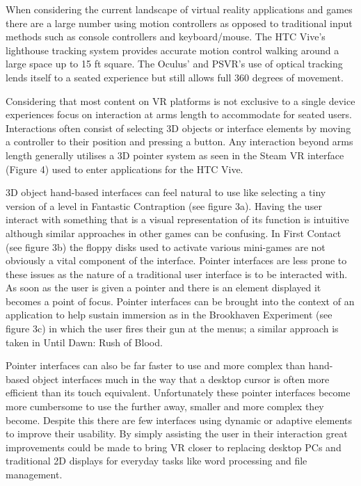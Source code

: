 \documentclass[12pt]{article}
\begin{document}
When considering the current landscape of virtual reality applications and games there are a large number using motion controllers as opposed to traditional input methods such as console controllers and keyboard/mouse. The HTC Vive's lighthouse tracking system provides accurate motion control walking around a large space up to 15 ft square. The Oculus' and PSVR's use of optical tracking lends itself to a seated experience but still allows full 360 degrees of movement. 

Considering that most content on VR platforms is not exclusive to a single device experiences focus on interaction at arms length to accommodate for seated users. Interactions often consist of selecting 3D objects or interface elements by moving a controller to their position and pressing a button. Any interaction beyond arms length generally utilises a 3D pointer system as seen in the Steam VR interface (Figure 4) used to enter applications for the HTC Vive.

3D object hand-based interfaces can feel natural to use like selecting a tiny version of a level in Fantastic Contraption (see figure 3a). Having the user interact with something that is a visual representation of its function is intuitive although similar approaches in other games can be confusing. In First Contact (see figure 3b) the floppy disks used to activate various mini-games are not obviously a vital component of the interface. Pointer interfaces are less prone to these issues as the nature of a traditional user interface is to be interacted with. As soon as the user is given a pointer and there is an element displayed it becomes a point of focus. Pointer interfaces can be brought into the context of an application to help sustain immersion as in the Brookhaven Experiment (see figure 3c) in which the user fires their gun at the menus; a similar approach is taken in Until Dawn: Rush of Blood. 

Pointer interfaces can also be far faster to use and more complex than hand-based object interfaces much in the way that a desktop cursor is often more efficient than its touch equivalent. Unfortunately these pointer interfaces become more cumbersome to use the further away, smaller and more complex they become. Despite this there are few interfaces using dynamic or adaptive elements to improve their usability. By simply assisting the user in their interaction great improvements could be made to bring VR closer to replacing desktop PCs and traditional 2D displays for everyday tasks like word processing and file management.
\end{document}
